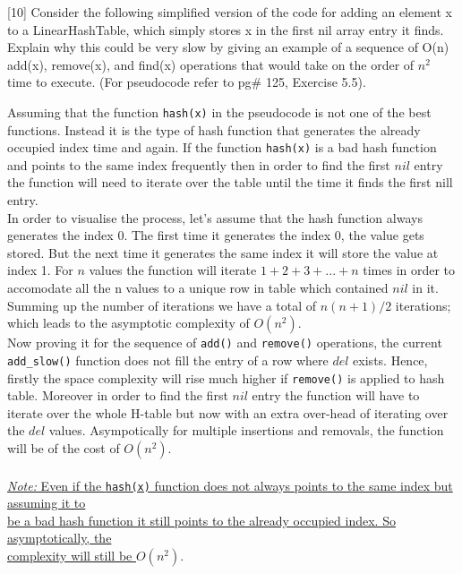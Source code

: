 \documentclass[addpoints]{exam}
\begin{document}
\begin{questions}
		[10]
		Consider the following simplified version of the code for
		adding an element x to a LinearHashTable, which simply stores x in the first nil array entry it finds. Explain why this could be very slow by giving an example of a sequence of O(n) add(x), remove(x), and find(x) operations that would take on the order of $n^2$ time to execute. (For pseudocode refer to pg\# 125, Exercise 5.5).
		\begin{solution}
		  Assuming that the function {\tt hash(x)} in the pseudocode is not one of the best functions. Instead it is the type of hash function that generates the already occupied index time and again. If the function {\tt hash(x)} is a bad hash function and points to the same index frequently then in order to find the first $nil$ entry the function will need to iterate over the table until the time it finds the first nill entry. \\In order to visualise the process, let's assume that the hash function always generates the index 0. The first time it generates the index 0, the value gets stored. But the next time it generates the same index it will store the value at index 1. For $n$ values the function will iterate $1+2+3+ ... + n$ times in order to accomodate all the n values to a unique row in table which contained $nil$ in it. Summing up the number of iterations we have a total of ${n(n+1)/2}$ iterations; which leads to the asymptotic complexity of $O({n^2})$.\\
		  Now proving it for the sequence of {\tt add()} and {\tt remove()} operations, the current {\tt add\_slow()} function does not fill the entry of a row where $del$ exists. Hence, firstly the space complexity will rise much higher if {\tt remove()} is applied to hash table. Moreover in order to find the first $nil$ entry the function will have to iterate over the whole H-table but now with an extra over-head of iterating over the $del$ values.	Asympotically for multiple insertions and removals, the function will be of the cost of $O({n^2})$.\\ \\
		  \underline{\textit{Note: }Even if the {\tt hash(x)} function does not always points to the same index but assuming it to}\\ \underline{be a bad hash function it still points to the already occupied index. So asymptotically, the}\\ \underline{complexity will still be $O({n^2})$}.
		\end{solution}
\pagebreak
		

\end{questions}
\end{document}
